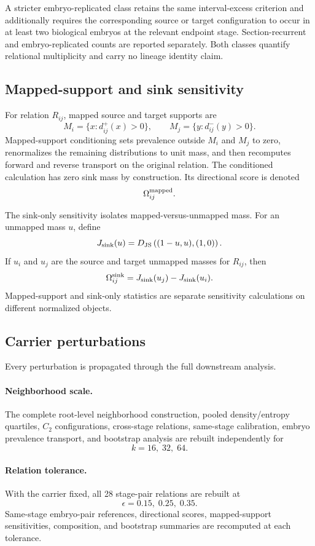 \documentclass[11pt]{article}
\begin{document}
A stricter embryo-replicated class retains the same interval-excess criterion and additionally requires the corresponding source or target configuration to occur in at least two biological embryos at the relevant endpoint stage. Section-recurrent and embryo-replicated counts are reported separately. Both classes quantify relational multiplicity and carry no lineage identity claim.

\subsection{Mapped-support and sink sensitivity}

For relation \(R_{ij}\), mapped source and target supports are
\[
M_i
=
\{x:d_{ij}^{+}(x)>0\},
\qquad
M_j
=
\{y:d_{ij}^{-}(y)>0\}.
\]
Mapped-support conditioning sets prevalence outside \(M_i\) and \(M_j\) to zero, renormalizes the remaining distributions to unit mass, and then recomputes forward and reverse transport on the original relation. The conditioned calculation has zero sink mass by construction. Its directional score is denoted
\[
\Omega_{ij}^{\rm mapped}.
\]

The sink-only sensitivity isolates mapped-versus-unmapped mass. For an unmapped mass \(u\), define
\[
J_{\rm sink}(u)
=
D_{\rm JS}\left(
(1-u,u),(1,0)
\right).
\]
If \(u_i\) and \(u_j\) are the source and target unmapped masses for \(R_{ij}\), then
\[
\Omega_{ij}^{\rm sink}
=
J_{\rm sink}(u_j)
-
J_{\rm sink}(u_i).
\]
Mapped-support and sink-only statistics are separate sensitivity calculations on different normalized objects.

\subsection{Carrier perturbations}

Every perturbation is propagated through the full downstream analysis.

\paragraph{Neighborhood scale.}
The complete root-level neighborhood construction, pooled density/entropy quartiles, \(C_2\) configurations, cross-stage relations, same-stage calibration, embryo prevalence transport, and bootstrap analysis are rebuilt independently for
\[
k=16,\;32,\;64.
\]

\paragraph{Relation tolerance.}
With the carrier fixed, all 28 stage-pair relations are rebuilt at
\[
\epsilon=0.15,\;0.25,\;0.35.
\]
Same-stage embryo-pair references, directional scores, mapped-support sensitivities, composition, and bootstrap summaries are recomputed at each tolerance.
\end{document}
